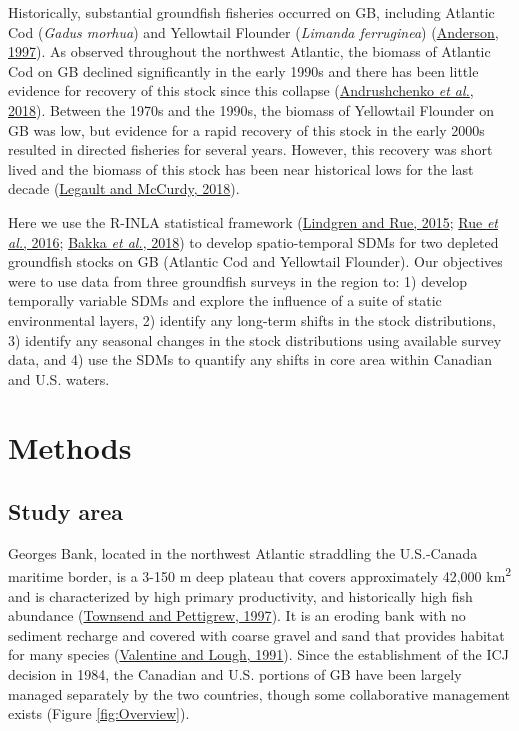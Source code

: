 \documentclass[
]{article}
\begin{document}
Historically, substantial groundfish fisheries occurred on GB, including Atlantic Cod (\emph{Gadus morhua}) and Yellowtail Flounder (\emph{Limanda ferruginea}) (\protect\hyperlink{ref-andersonHistoryFisheriesManagement1997}{Anderson, 1997}). As observed throughout the northwest Atlantic, the biomass of Atlantic Cod on GB declined significantly in the early 1990s and there has been little evidence for recovery of this stock since this collapse (\protect\hyperlink{ref-andrushchenkoAssessmentEasternGeorges2018}{Andrushchenko \emph{et al.}, 2018}). Between the 1970s and the 1990s, the biomass of Yellowtail Flounder on GB was low, but evidence for a rapid recovery of this stock in the early 2000s resulted in directed fisheries for several years. However, this recovery was short lived and the biomass of this stock has been near historical lows for the last decade (\protect\hyperlink{ref-legaultStockAssessmentGeorges2018}{Legault and McCurdy, 2018}).

Here we use the R-INLA statistical framework (\protect\hyperlink{ref-lindgrenBayesianSpatialModelling2015}{Lindgren and Rue, 2015}; \protect\hyperlink{ref-rueBayesianComputingINLA2016}{Rue \emph{et al.}, 2016}; \protect\hyperlink{ref-bakkaSpatialModellingRINLA2018}{Bakka \emph{et al.}, 2018}) to develop spatio-temporal SDMs for two depleted groundfish stocks on GB (Atlantic Cod and Yellowtail Flounder). Our objectives were to use data from three groundfish surveys in the region to: 1) develop temporally variable SDMs and explore the influence of a suite of static environmental layers, 2) identify any long-term shifts in the stock distributions, 3) identify any seasonal changes in the stock distributions using available survey data, and 4) use the SDMs to quantify any shifts in core area within Canadian and U.S. waters.

\hypertarget{ref-methods}{%
\section{Methods}\label{ref-methods}}

\hypertarget{study-area}{%
\subsection{Study area}\label{study-area}}

Georges Bank, located in the northwest Atlantic straddling the U.S.-Canada maritime border, is a 3-150 m deep plateau that covers approximately 42,000 km\textsuperscript{2} and is characterized by high primary productivity, and historically high fish abundance (\protect\hyperlink{ref-townsendNitrogenLimitationSecondary1997}{Townsend and Pettigrew, 1997}). It is an eroding bank with no sediment recharge and covered with coarse gravel and sand that provides habitat for many species (\protect\hyperlink{ref-valentineSeaFloorEnvironment1991}{Valentine and Lough, 1991}). Since the establishment of the ICJ decision in 1984, the Canadian and U.S. portions of GB have been largely managed separately by the two countries, though some collaborative management exists (Figure \ref{fig:Overview}).
\end{document}
